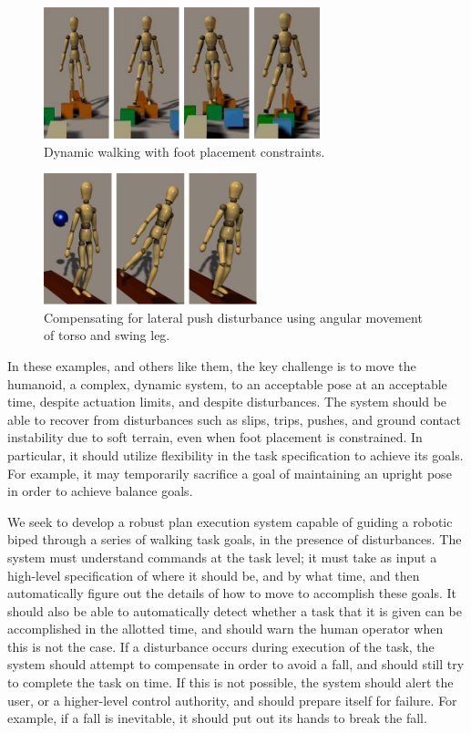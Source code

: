 \documentclass{llncs}
\begin{document}
\begin{figure}[b]
\includegraphics[height=1.5in]{WalkOnStonesIntro1}
\caption{Dynamic walking with foot placement constraints.}
\label{fig:WalkOnStonesIntro1}       
\end{figure}

\begin{figure}[b]
\includegraphics[height=1.5in]{LatPushIntro1}
\caption{Compensating for lateral push disturbance using angular movement of torso and swing leg.}
\label{fig:LatPushIntro1}       
\end{figure}

In these examples, and others like them, the key challenge is to move the humanoid,
a complex, dynamic system, to an acceptable pose at an acceptable time, despite actuation limits, and despite disturbances.
The system should be able to recover from disturbances such as slips, trips, pushes, and ground contact instability due to soft terrain, 
even when foot placement is constrained.  
In particular, it should utilize flexibility in the task specification to achieve its goals.
For example, it may temporarily sacrifice a goal of maintaining an upright pose in order to achieve balance goals.

We seek to develop a robust plan execution system capable of guiding a robotic biped through a series of walking task goals, in the presence of disturbances.  
The system must understand commands at the task level;  it must take as input a high-level specification of where it should be, and by what time, and then 
automatically figure out the details of how to move to accomplish these goals.  
It should also be able to automatically detect whether a task that it is given can be accomplished in the allotted time, and should warn the human operator 
when this is not the case.  
If a disturbance occurs during execution of the task, the system should attempt to compensate in order to avoid a fall, and should still try to 
complete the task on time.  
If this is not possible, the system should alert the user, or a higher-level control authority, and should prepare itself for failure.
For example, if a fall is inevitable, it should put out its hands to break the fall.
\end{document}
